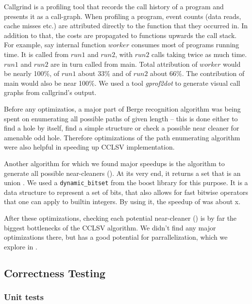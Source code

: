 Callgrind is a profiling tool that records the call history of a program and presents it as a call-graph. When profiling a program, event counts (data reads, cache misses etc.) are attributed directly to the function that they occurred in. In addition to that, the costs are propagated to functions upwards the call stack. For example, say internal function $worker$ consumes most of programs running time. It is called from $run1$ and $run2$, with $run2$ calls taking twice as much time. $run1$ and $run2$ are in turn called from main. Total attribution of $worker$ would be nearly 100\%, of $run1$ about 33\% and of $run2$ about 66\%. The contribution of main would also be near 100\%. We used a tool \emph{gprof2dot} \cite{gprof2dot} to generate visual call graphs from callgrind's output.

Before any optimizatios, a major part of Berge recognition algorithm was being spent on enumerating all possible paths of given length -- this is done either to find a hole by itself, find a simple structure or check a possible near cleaner for amenable odd hole. Therefore optimizations of the path enumerating algorithm were also helpful in speeding up CCLSV implementation.

Another algorithm for which we found major speedups is the algorithm to generate all possible near-cleaners (). At its very end, it returns a set that is an union . We used a \texttt{dynamic\_bitset} from the boost library \cite{boost} for this purpose. It is a data structure to represent a set of bits, that also allows for fast bitwise operators that one can apply to builtin integers. By using it, the speedup of  was about x. 

After these optimizations, checking each potential near-cleaner () is by far the biggest bottlenecks of the CCLSV algorithm. We didn't find any major optimizations there, but  has a good potential for parrallelization, which we explore in .

\subsection{Correctness Testing}

\subsubsection{Unit tests}

